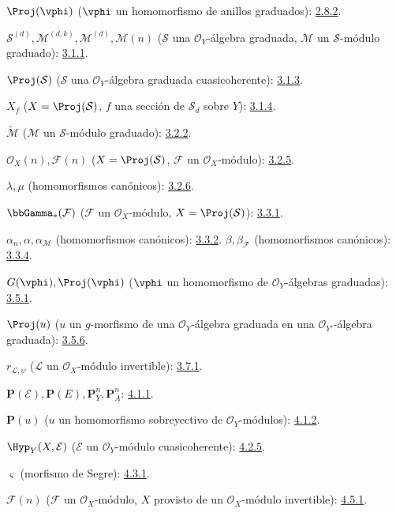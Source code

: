 \documentclass[oneside,10pt]{amsart}
\newcommand{\oldpage}[2][]{\marginnote{\normalfont\footnotesize\textbf{#1}~|~#2}\ignorespaces}
\begin{document}
$\Proj(\vphi)$ ($\vphi$ un homomorfismo de anillos graduados): \hyperref[II.2.8.2-fr]{2.8.2}.

$\mathcal{S}^{(d)},\mathcal{M}^{(d,k)},\mathcal{M}^{(d)},\mathcal{M}(n)$
($\mathcal{S}$ una $\mathcal{O}_Y$-álgebra graduada,
$\mathcal{M}$ un $\mathcal{S}$-módulo graduado): \hyperref[II.3.1.1-fr]{3.1.1}.

$\Proj(\mathcal{S})$ ($\mathcal{S}$ una $\mathcal{O}_Y$-álgebra graduada cuasicoherente): \hyperref[II.3.1.3-fr]{3.1.3}.

$X_f$ ($X=\Proj(\mathcal{S})$, $f$ una sección de $\mathcal{S}_d$ sobre $Y$): \hyperref[II.3.1.4-fr]{3.1.4}.

$\widetilde{\mathcal{M}}$ ($\mathcal{M}$ un $\mathcal{S}$-módulo graduado): \hyperref[II.3.2.2-fr]{3.2.2}.

$\mathcal{O}_X(n),\mathcal{F}(n)$
($X=\Proj(\mathcal{S})$, $\mathcal{F}$ un $\mathcal{O}_X$-módulo): \hyperref[II.3.2.5-fr]{3.2.5}.

$\lambda,\mu$ (homomorfismos canónicos): \hyperref[II.3.2.6-fr]{3.2.6}.

$\bbGamma_*(\mathcal{F})$ ($\mathcal{F}$ un $\mathcal{O}_X$-módulo,
$X=\Proj(\mathcal{S})$): \hyperref[II.3.3.1-fr]{3.3.1}.

$\alpha_n,\alpha,\alpha_{\mathcal{M}}$ (homomorfismos canónicos): \hyperref[II.3.3.2-fr]{3.3.2}.
\oldpage[II]{208}
$\beta,\beta_{\mathcal{F}}$ (homomorfismos canónicos): \hyperref[II.3.3.4-fr]{3.3.4}.

$G(\vphi),\Proj(\vphi)$
($\vphi$ un homomorfismo de $\mathcal{O}_Y$-álgebras graduadas): \hyperref[II.3.5.1-fr]{3.5.1}.

$\Proj(u)$ ($u$ un $g$-morfismo de una $\mathcal{O}_Y$-álgebra graduada
en una $\mathcal{O}_{Y'}$-álgebra graduada): \hyperref[II.3.5.6-fr]{3.5.6}.

$r_{\mathcal{L},\psi}$ ($\mathcal{L}$ un $\mathcal{O}_X$-módulo invertible): \hyperref[II.3.7.1-fr]{3.7.1}.

$\mathbf{P}(\mathcal{E}),\mathbf{P}(E),\mathbf{P}_Y^n,\mathbf{P}_A^n$: \hyperref[II.4.1.1-fr]{4.1.1}.

$\mathbf{P}(u)$ ($u$ un homomorfismo sobreyectivo de $\mathcal{O}_Y$-módulos): \hyperref[II.4.1.2-fr]{4.1.2}.

$\Hyp_Y(X,\mathcal{E})$ ($\mathcal{E}$ un $\mathcal{O}_Y$-módulo cuasicoherente): \hyperref[II.4.2.5-fr]{4.2.5}.

$\varsigma$ (morfismo de Segre): \hyperref[II.4.3.1-fr]{4.3.1}.

$\mathcal{F}(n)$ ($\mathcal{F}$ un $\mathcal{O}_X$-módulo, $X$ provisto de un
$\mathcal{O}_X$-módulo invertible): \hyperref[II.4.5.1-fr]{4.5.1}.
\end{document}
